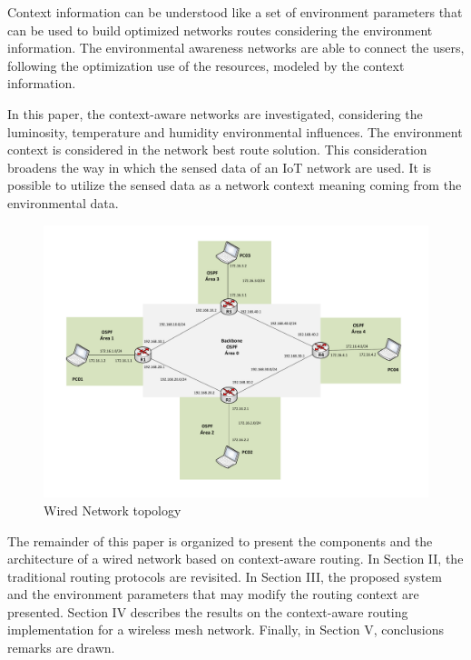 Context information can be understood like a set of environment parameters that can be used to build optimized networks routes considering the environment information. The environmental awareness networks are able to connect the users, following the optimization use of the resources, modeled by the context information.

In this paper, the context-aware networks are investigated, considering the luminosity, temperature and humidity environmental influences. The environment context is considered in the network best route solution. This consideration broadens the way in which the sensed data of an IoT network are used. It is possible to utilize the sensed data as a network context meaning coming from the environmental data.

\begin{figure}[!t]
	\centering
	\includegraphics[width=\textwidth]{figs/topologia-2.pdf}
	\caption{Wired Network topology}
	\label{Fig01}
\end{figure}

The remainder of this paper is organized to present the components and the architecture of a wired network based on context-aware routing. In Section II, the traditional routing protocols are revisited. In Section III, the proposed system and the environment parameters that may modify the routing context are presented. Section IV describes the results on the context-aware routing implementation for a wireless mesh network. Finally, in Section V, conclusions remarks are drawn. 